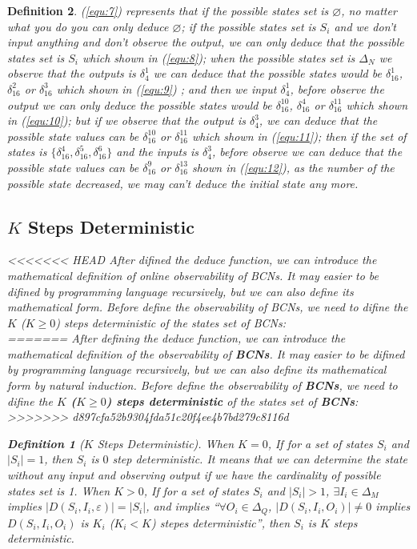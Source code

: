\documentclass[conference]{IEEEtran} %
\newtheorem{definition}{Definition}
\begin{document}
\begin{definition}
{\em (\ref{equ:7})} represents that if the possible states set is $\varnothing$, no matter what you do you can only deduce $\varnothing$; if the possible states set is $S_i$ and we don't input anything and don't observe the output, we can only deduce that the possible states set is $S_i$ which shown in {\em (\ref{equ:8})}; when the possible states set is $\Delta_N$ we observe that the outputs is $\delta_4^1$ we can deduce that the possible states would be $\delta_{16}^1$, $\delta_{16}^2$ or  $\delta_{16}^3$ which shown in {\em (\ref{equ:9})} ; and then we input $\delta_4^1$, before observe the output we can only deduce the possible states would be   $\delta_{16}^{10}$, $\delta_{16}^4$ or  $\delta_{16}^{11}$ which shown in {\em (\ref{equ:10})}; but if we observe that the output is $\delta_4^3$, we can deduce that the possible state values can be $\delta_{16}^{10}$ or  $\delta_{16}^{11}$ which shown in {\em (\ref{equ:11})}; then if the set of states is $\{\delta_{16}^4,\delta_{16}^5,\delta_{16}^6\}$ and the inputs is $\delta_4^3$, before observe we can deduce that the possible state values can be $\delta_{16}^9$ or  $\delta_{16}^{13}$ shown in {\em (\ref{equ:12})}, as  the number of the possible state decreased, we may can't deduce the initial state any more. 

\subsection{$K$ Steps Deterministic}
<<<<<<< HEAD
After difined the deduce function, we can introduce the mathematical definition of online observability of {\em BCNs}. It may easier to be difined by programming language recursively, but we can also define its mathematical form. Before define the observability of {\em BCNs}, we need to difine the  {\em  $K$ ($K\ge0$) steps deterministic} of the states set of {\em BCNs}:\\
=======
After defining the deduce function, we can introduce the mathematical definition of the observability of {\bf BCNs}. It may easier to be difined by programming language recursively, but we can also define its mathematical form by natural induction. Before define the observability of {\bf BCNs}, we need to difine the  {\bf  $K$ ($K\ge0$) steps deterministic} of the states set of {\bf BCNs}:\\
>>>>>>> d897cfa52b9304fda51c20f4ee4b7bd279c8116d
\begin{definition}[$K$ Steps Deterministic] 
When $K=0$, 
 If for a set of states $S_i$ and $|S_i|=1$, then $S_i$ is $0$ step deterministic. It means that we can determine the state without any input and observing output if we have the cardinality of possible states set is 1. When $K>0$, 
 If for a set of states $S_i$ and $|S_i|>1$, $\exists I_i \in \Delta_M$ implies $|D\left(S_i,I_i,\varepsilon\right)|=|S_i|$, and implies ``$\forall O_i\in \Delta_Q$, $|D\left(S_i,I_i,O_i\right)|\neq 0$ implies $D\left(S_i,I_i,O_i\right)$ is $K_i$ ($K_i<K$) stepes deterministic'', then $S_i$ is $K$ steps deterministic.
\end{definition}


\end{definition}
\end{document}
